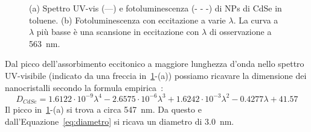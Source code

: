 \begin{figure}[!htb]
\caption{\footnotesize{(a) Spettro UV-vis (---) e fotoluminescenza (- - -) di NPs di CdSe in toluene. (b) Fotoluminescenza con eccitazione a varie $\lambda$. La curva a $\lambda$ più basse è una scansione in eccitazione con $\lambda$ di osservazione a 563~nm. }}
\label{fig:CdSe-TOPO_TDPA-in_toluene-UV_PL-movimento}
\end{figure}

Dal picco dell'assorbimento eccitonico a maggiore lunghezza d'onda nello spettro UV-visibile (indicato da una freccia in~\ref{fig:CdSe-TOPO_TDPA-in_toluene-UV_PL-movimento}-(a)) possiamo ricavare la dimensione dei nanocristalli secondo la formula empirica~\cite{qd-CdSe-caratt}:
{\footnotesize{
\begin{equation}
D_{CdSe}=1.6122\cdot10^{-9}\lambda^4-2.6575\cdot10^{-6}\lambda^3+1.6242\cdot10^{-3}\lambda^2-0.4277\lambda+41.57
\label{eq:diametro}
\end{equation}
}}
Il picco in~\ref{fig:CdSe-TOPO_TDPA-in_toluene-UV_PL-movimento}-(a) si trova a circa 547~nm. Da questo e dall'Equazione~\ref{eq:diametro} si ricava un diametro di 3.0~nm. 

